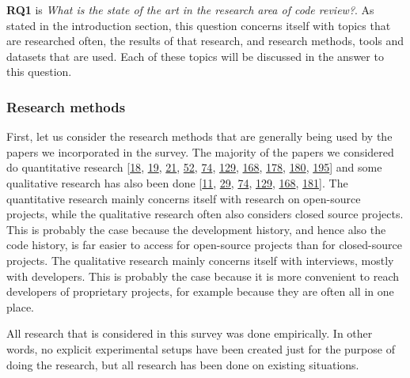 \documentclass[]{book}
\begin{document}
\textbf{RQ1} is \emph{What is the state of the art in the research area
of code review?}. As stated in the introduction section, this question
concerns itself with topics that are researched often, the results of
that research, and research methods, tools and datasets that are used.
Each of these topics will be discussed in the answer to this question.

\subsubsection{Research methods}\label{research-methods}

First, let us consider the research methods that are generally being
used by the papers we incorporated in the survey. The majority of the
papers we considered do quantitative research
{[}\protect\hyperlink{ref-baysal2016investigating}{18},
\protect\hyperlink{ref-baysal2013influence}{19},
\protect\hyperlink{ref-beller2014modern}{21},
\protect\hyperlink{ref-czerwonka2015code}{52},
\protect\hyperlink{ref-gousios2014exploratory}{74},
\protect\hyperlink{ref-mcintosh2014impact}{129},
\protect\hyperlink{ref-shimagaki2016study}{168},
\protect\hyperlink{ref-thongtanunam2017review}{178},
\protect\hyperlink{ref-thongtanunam2015should}{180},
\protect\hyperlink{ref-zanjani2016automatically}{195}{]} and some
qualitative research has also been done
{[}\protect\hyperlink{ref-bacchelli2013expectations}{11},
\protect\hyperlink{ref-bird2015lessons}{29},
\protect\hyperlink{ref-gousios2014exploratory}{74},
\protect\hyperlink{ref-mcintosh2014impact}{129},
\protect\hyperlink{ref-shimagaki2016study}{168},
\protect\hyperlink{ref-thongtanunam2014reda}{181}{]}. The quantitative
research mainly concerns itself with research on open-source projects,
while the qualitative research often also considers closed source
projects. This is probably the case because the development history, and
hence also the code history, is far easier to access for open-source
projects than for closed-source projects. The qualitative research
mainly concerns itself with interviews, mostly with developers. This is
probably the case because it is more convenient to reach developers of
proprietary projects, for example because they are often all in one
place.

All research that is considered in this survey was done empirically. In
other words, no explicit experimental setups have been created just for
the purpose of doing the research, but all research has been done on
existing situations.
\end{document}
